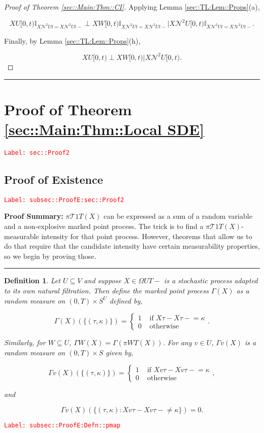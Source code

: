 \documentclass[12pt]{article}
\newcommand{\mb}{\mathbb}
\newcommand{\mc}{\mathcal}
\newcommand{\te}{\text}
\newcommand{\tr}{\textcolor{red}}
\newcommand{\labe}[1]{\tr{\texttt{Label: #1}}}
\newcommand{\pfsum}{\textbf{Proof Summary: }}
\newcommand{\lin}{\rule{\linewidth}{0.4 pt}}
\renewcommand{\v}{v}							%
\renewcommand{\U}{U}							%
\newcommand{\UU}{W}								%
\renewcommand{\S}{S}							%
\newcommand{\T}{T}								%
\renewcommand{\t}{t}							%
\newcommand{\proj}{\pi}							%
\newcommand{\X}{X}								%
\newcommand{\dneigh}{\mc{N}^2}					%
\newcommand{\carp}[1]{^{#1}}					%
\newcommand{\tree}{\mc{T}}						%
\newcommand{\rt}{\tau}							%
\newcommand{\pmap}{\Gamma}						%
\renewcommand{\mark}{\kappa}					%
\newtheorem{defn}[thms]{Definition}
\begin{document}
\begin{proof}[Proof of Theorem \ref{sec::Main:Thm::CI}]
Applying Lemma \ref{sec::TL:Lem::Props}(a),

\[\X{\U}{[0,\t)}\mb{I}_{\X{\dneigh{\U}}{\t} = \X{\dneigh{\U}}{\t-}}\perp\X{\UU}{[0,\t)}\mb{I}_{\X{\dneigh{\U}}{\t} = \X{\dneigh{\U}}{\t-}}\big|\X{\dneigh{\U}}{[0,\t)}\mb{I}_{\X{\dneigh{\U}}{\t} = \X{\dneigh{\U}}{\t-}}.\]

Finally, by Lemma \ref{sec::TL:Lem::Props}(h),

\[\X{\U}{[0,\t)}\perp\X{\UU}{[0,\t)}\big|\X{\dneigh{\U}}{[0,\t)}.\]
\end{proof}

\lin

\section{Proof of Theorem \ref{sec::Main:Thm::Local SDE}}
\label{sec::Proof2}\labe{sec::Proof2}

\subsection{Proof of Existence}
\label{subsec::ProofE:sec::Proof2}\labe{subsec::ProofE:sec::Proof2}

\pfsum \(\proj{\tree{1}}{\T}(\X{}{})\) can be expressed as a sum of a random variable and a non-explosive marked point process. The trick is to find a \(\proj{\tree{1}}{\T}(\X{}{})\)-measurable intensity for that point process. However, theorems that allow us to do that require that the candidate intensity have certain measurability properties, so we begin by proving those.

\lin

\begin{defn}
Let \(\U\subseteq V\) and suppose \(\X{}{} \in \Omega{\U}{\T-}\) is a stochastic process adapted to its own natural filtration. Then define the marked point process \(\pmap{}(\X{}{})\) as a random measure on \((0,\T) \times \S\carp{\U}\) defined by,

\[\pmap{}(\X{}{})(\{(\rt{},\mark{})\}) = \begin{cases}
1 &\te{ if } \X{}{\rt{}} - \X{}{\rt{}-} = \mark{}\\
0 &\te{ otherwise}
\end{cases}.\]

Similarly, for \(\UU \subseteq \U\), \(\pmap{\UU}(\X{}{}) = \pmap{}\left(\proj{\UU}{\T}(\X{}{})\right)\). For any \(\v\in \U\), \(\pmap{\v}(\X{}{})\) is a random measure on \((0,\T) \times \S\) given by,

\[\pmap{\v}(\X{}{})(\{(\rt{},\mark{})\}) = \begin{cases}
1 &\te{ if } \X{\v}{\rt{}} - \X{\v}{\rt{}-} = \mark{}\\
0 &\te{ otherwise}
\end{cases},\]

and

\[\pmap{\v}(\X{}{})(\{(\rt{},\mark{}): \X{\v}{\rt{}} - \X{\v}{\rt{}-} \neq \mark{}\}) = 0.\]
\label{subsec::ProofE:Defn::pmap}
\end{defn}
\labe{subsec::ProofE:Defn::pmap}
\end{document}
